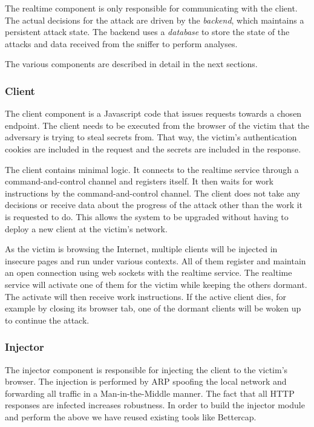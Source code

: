The realtime component is only responsible for communicating with the client.
The actual decisions for the attack are driven by the \textit{backend}, which
maintains a persistent attack state. The backend uses a \textit{database} to
store the state of the attacks and data received from the sniffer to perform
analyses.

The various components are described in detail in the next sections.

\subsubsection{Client}

The client component is a Javascript code that issues requests towards a chosen
endpoint. The client needs to be executed from the browser of the victim that
the adversary is trying to steal secrets from. That way, the victim's
authentication cookies are included in the request and the secrets are included
in the response.

The client contains minimal logic. It connects to the realtime service through a
command-and-control channel and registers itself. It then waits for work
instructions by the command-and-control channel. The client does not take any
decisions or receive data about the progress of the attack other than the work
it is requested to do. This allows the system to be upgraded without having to
deploy a new client at the victim's network.

As the victim is browsing the Internet, multiple clients will be injected in
insecure pages and run under various contexts. All of them register and maintain
an open connection using web sockets with the realtime service. The realtime service
will activate one of them for the victim while keeping the others dormant. The
activate will then receive work instructions. If the active client dies, for
example by closing its browser tab, one of the dormant clients will be woken up
to continue the attack.

\subsubsection{Injector}

The injector component is responsible for injecting the client to the victim's
browser. The injection is performed by ARP spoofing the local network and
forwarding all traffic in a Man-in-the-Middle manner. The fact that all HTTP
responses are infected increases robustness. In order to build the injector
module and perform the above we have reused existing tools like Bettercap.

